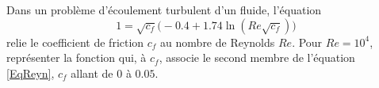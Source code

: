\begin{exercice}\label{exoSC_serie2-0005}

	Dans un problème d'écoulement turbulent d'un fluide, l'équation
	\begin{equation}		\label{EqReyn}
		1=\sqrt{c_f}\big( -0.4+1.74\ln(Re\sqrt{c_f}) \big)
	\end{equation}
	relie le coefficient de friction $c_f$ au nombre de Reynolds $Re$. Pour $Re=10^4$, représenter la fonction qui, à $c_f$, associe le second membre de l'équation \eqref{EqReyn}, $c_f$ allant de $0$ à $0.05$.

\end{exercice}
